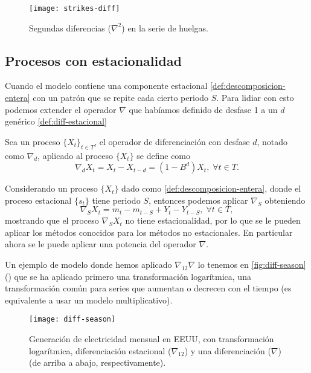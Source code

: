 \begin{figure}[htpb]
  \centering
  \texttt{[image: strikes-diff]}
  \caption{Segundas diferencias ($\nabla^2$) en la serie de huelgas.}
  \label{fig:strikes-diff}
\end{figure}

\subsection{Procesos con estacionalidad}

Cuando el modelo contiene una componente estacional \autoref{def:descomposicion-entera} con un patrón que se repite cada cierto periodo $S$. Para lidiar con esto podemos extender el operador $\nabla$ que habíamos definido de desfase 1 a un $d$ genérico \autoref{def:diff-estacional}

\begin{definicion}
  Sea un proceso $\{X_t\}_{t \in T}$, el operador de diferenciación con desfase $d$, notado como $\nabla_d$, aplicado al proceso $\{X_t\}$ se define como
  $$\nabla_d X_t = X_t - X_{t - d} = (1 - B^d)X_t, \; \forall t \in T.$$
\label{def:diff-estacional}
\end{definicion}

Considerando un proceso $\{X_t\}$ dado como \autoref{def:descomposicion-entera}, donde el proceso estacional $\{s_t\}$ tiene periodo $S$, entonces podemos aplicar $\nabla_S$ obteniendo
\begin{equation*}
  \nabla_S X_t = m_t - m_{t - S} + Y_t - Y_{t - S}, \; \forall t \in T,
\label{eq:diff-estacional}
\end{equation*}
mostrando que el proceso $\nabla_S X_t$ no tiene estacionalidad, por lo que se le pueden aplicar los métodos conocidos para los métodos no estacionales. En particular ahora se le puede aplicar una potencia del operador $\nabla$.

Un ejemplo de modelo donde hemos aplicado $\nabla_12 \nabla$ lo tenemos en \autoref{fig:diff-season} (\cite{hyndman2018forecasting}) que se ha aplicado primero una transformación logarítmica, una transformación común para series que aumentan o decrecen con el tiempo (es equivalente a usar un modelo multiplicativo).

\begin{figure}[htpb]
  \centering
  \texttt{[image: diff-season]}
  \caption{Generación de electricidad mensual en EEUU, con transformación logarítmica, diferenciación estacional ($\nabla_{12}$) y una diferenciación ($\nabla$) (de arriba a abajo, respectivamente).}
  \label{fig:diff-season}
\end{figure}

